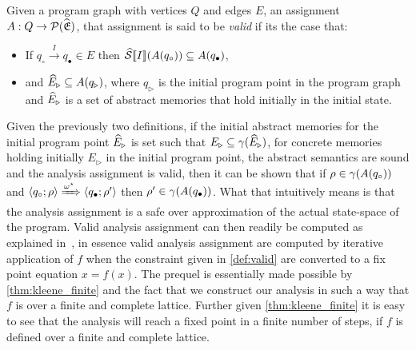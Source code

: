 \begin{definition}
    \label{def:valid}
    Given a program graph with vertices $Q$ and edges $E$, an assignment $A : Q \rightarrow \mathcal{P}(\widehat{\mathfrak{E}})$, that assignment is said to be \emph{valid} if its the case that:
    \begin{itemize}
        \item If $q_\circ \xrightarrow{I} q_\bullet \in E$ then $\widehat{\mathcal{S}} \llbracket I \rrbracket(A(q_\circ)) \subseteq A(q_\bullet)$,
        \item and $\widehat{E}_\triangleright \subseteq A(q_\triangleright)$, where $q_\triangleright$ is the initial program point in the program graph and $\widehat{E}_\triangleright$ is a set of abstract memories that hold initially in the initial state.
    \end{itemize}
\end{definition}

Given the previously two definitions, if the initial abstract memories for the initial program point $\widehat{E}_\triangleright$ is set such that $E_{\triangleright} \subseteq \gamma(\widehat{E}_\triangleright)$, for concrete memories holding initially $E_{\triangleright}$ in the initial program point, the abstract semantics are sound and the analysis assignment is valid, then it can be shown that if $\rho \in \gamma(A(q_\circ))$ and $\langle q_\circ; \rho \rangle \xRightarrow{\omega^\star} \langle q_\bullet; \rho' \rangle$ then $\rho' \in \gamma(A(q_\bullet))$.
What that intuitively means is that the analysis assignment is a safe over approximation of the actual state-space of the program.
Valid analysis assignment can then readily be computed as explained in~\cite{nielson_formal_2019}, in essence valid analysis assignment are computed by iterative application of $f$ when the constraint given in \autoref{def:valid} are converted to a fix point equation $x = f(x)$.
The prequel is essentially made possible by \autoref{thm:kleene_finite} and the fact that we construct our analysis in such a way that $f$ is over a finite and complete lattice.
Further given \autoref{thm:kleene_finite} it is easy to see that the analysis will reach a fixed point in a finite number of steps, if $f$ is defined over a finite and complete lattice.

